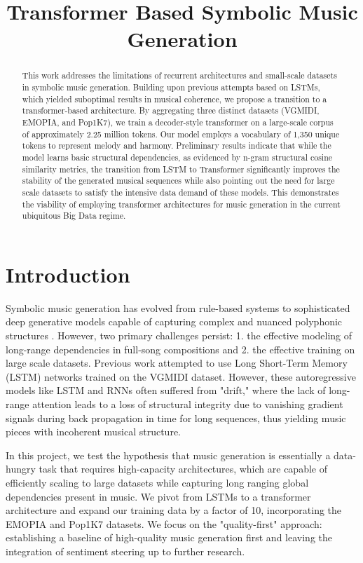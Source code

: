 \documentclass{article}
\title{Transformer Based Symbolic Music Generation}
\begin{document}
\maketitle

\begin{abstract}
This work addresses the limitations of recurrent architectures and small-scale datasets in 
symbolic music generation. Building upon previous attempts based on LSTMs, which yielded 
suboptimal results in musical coherence, we propose a transition to a transformer-based 
architecture. By aggregating three distinct datasets (VGMIDI, EMOPIA, and Pop1K7), 
we train a decoder-style transformer on a large-scale corpus of approximately 2.25 million tokens. 
Our model employs a vocabulary of 1,350 unique tokens to represent melody and harmony. 
Preliminary results indicate that while the model learns basic structural dependencies, as 
evidenced by n-gram structural cosine similarity metrics, the transition from LSTM to Transformer 
significantly improves the stability of the generated musical sequences while also pointing 
out the need for large scale datasets to satisfy the intensive data demand of these models.
This demonstrates the viability of employing transformer architectures for music generation
in the current ubiquitous Big Data regime.
\end{abstract}

\section{Introduction}\label{sec:introduction}
Symbolic music generation has evolved from rule-based systems \cite{davis2014} to sophisticated deep 
generative models capable of capturing complex and nuanced polyphonic structures \cite{compoundword}. 
However, two primary challenges persist: 1. the effective modeling of long-range dependencies in 
full-song compositions and 2. the effective training on large scale datasets. 
Previous work \cite{vgmidi} attempted to use Long Short-Term Memory (LSTM) networks trained on the 
VGMIDI dataset. However, these autoregressive models like LSTM and RNNs often 
suffered from "drift," where the lack of long-range attention leads to a loss of structural 
integrity due to vanishing gradient signals during back propagation in time for long sequences,
thus yielding music pieces with incoherent musical structure.

In this project, we test the hypothesis that music generation is essentially a data-hungry task that 
requires high-capacity architectures, which are capable of efficiently scaling to large datasets while
capturing long ranging global dependencies present in music. We pivot from LSTMs to a 
transformer architecture and expand our training data by a factor of 10, incorporating the EMOPIA and 
Pop1K7 datasets. We focus on the "quality-first" approach: establishing a baseline of high-quality music 
generation first and leaving the integration of sentiment steering up to further research.
\end{document}
